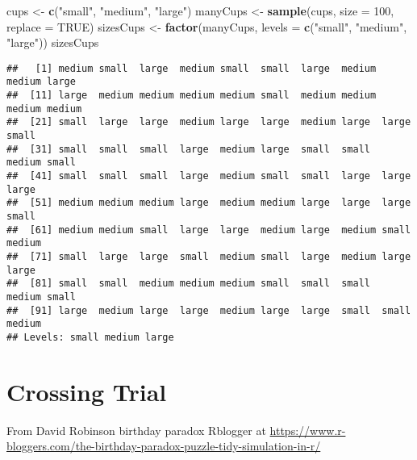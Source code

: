 \documentclass[]{book}
\newenvironment{Shaded}{\begin{snugshade}}{\end{snugshade}}
\newcommand{\DataTypeTok}[1]{\textcolor[rgb]{0.13,0.29,0.53}{#1}}
\newcommand{\DecValTok}[1]{\textcolor[rgb]{0.00,0.00,0.81}{#1}}
\newcommand{\KeywordTok}[1]{\textcolor[rgb]{0.13,0.29,0.53}{\textbf{#1}}}
\newcommand{\NormalTok}[1]{#1}
\newcommand{\OtherTok}[1]{\textcolor[rgb]{0.56,0.35,0.01}{#1}}
\newcommand{\StringTok}[1]{\textcolor[rgb]{0.31,0.60,0.02}{#1}}
\begin{document}
\begin{Shaded}
\begin{Highlighting}[]
\NormalTok{cups <-}\StringTok{ }\KeywordTok{c}\NormalTok{(}\StringTok{"small"}\NormalTok{, }\StringTok{"medium"}\NormalTok{, }\StringTok{"large"}\NormalTok{)}
\NormalTok{manyCups <-}\StringTok{ }\KeywordTok{sample}\NormalTok{(cups, }\DataTypeTok{size =} \DecValTok{100}\NormalTok{, }\DataTypeTok{replace =} \OtherTok{TRUE}\NormalTok{)}
\NormalTok{sizesCups <-}\StringTok{ }\KeywordTok{factor}\NormalTok{(manyCups, }\DataTypeTok{levels =} \KeywordTok{c}\NormalTok{(}\StringTok{"small"}\NormalTok{, }\StringTok{"medium"}\NormalTok{, }\StringTok{"large"}\NormalTok{))}
\NormalTok{sizesCups}
\end{Highlighting}
\end{Shaded}

\begin{verbatim}
##   [1] medium small  large  medium small  small  large  medium medium large 
##  [11] large  medium medium medium medium small  medium medium medium medium
##  [21] small  large  large  medium large  large  medium large  large  small 
##  [31] small  small  small  large  medium large  small  small  medium small 
##  [41] small  small  small  large  medium small  small  large  large  large 
##  [51] medium medium medium large  medium medium large  large  large  small 
##  [61] medium medium small  large  large  medium large  medium small  medium
##  [71] small  large  large  small  medium small  large  medium large  large 
##  [81] small  small  medium medium medium small  small  small  medium small 
##  [91] large  medium large  large  medium large  large  small  small  medium
## Levels: small medium large
\end{verbatim}

\hypertarget{crossing-trial}{%
\chapter{Crossing Trial}\label{crossing-trial}}

From David Robinson birthday paradox Rblogger at \url{https://www.r-bloggers.com/the-birthday-paradox-puzzle-tidy-simulation-in-r/}
\end{document}
